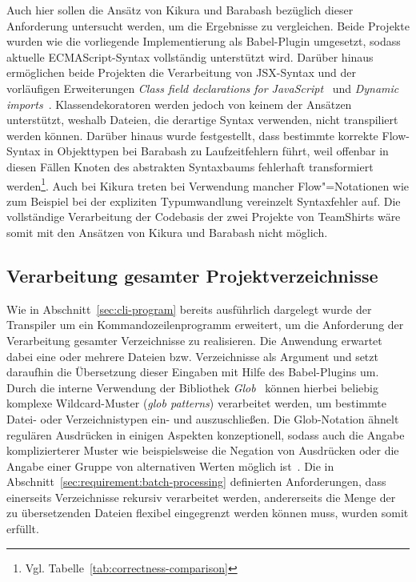 Auch hier sollen die Ansätz von Kikura und Barabash bezüglich dieser Anforderung untersucht werden, um die Ergebnisse zu vergleichen. Beide Projekte wurden wie die vorliegende Implementierung als Babel-Plugin umgesetzt, sodass aktuelle ECMAScript-Syntax vollständig unterstützt wird. Darüber hinaus ermöglichen beide Projekten die Verarbeitung von JSX-Syntax und der vorläufigen Erweiterungen \textit{Class field declarations for JavaScript}~\autocite{ES_PROPOSAL:CLASS_FIELDS} und \textit{Dynamic imports}~\autocite{ES_PROPOSAL:DYNAMIC_IMPORTS}. Klassendekoratoren werden jedoch von keinem der Ansätzen unterstützt, weshalb Dateien, die derartige Syntax verwenden, nicht transpiliert werden können. Darüber hinaus wurde festgestellt, dass bestimmte korrekte Flow-Syntax in Objekttypen bei Barabash zu Laufzeitfehlern führt, weil offenbar in diesen Fällen Knoten des abstrakten Syntaxbaums fehlerhaft transformiert werden\footnote{Vgl. Tabelle~\ref{tab:correctness-comparison}}. Auch bei Kikura treten bei Verwendung mancher Flow"=Notationen wie zum Beispiel bei der expliziten Typumwandlung vereinzelt Syntaxfehler auf. Die vollständige Verarbeitung der Codebasis der zwei Projekte von TeamShirts wäre somit mit den Ansätzen von Kikura und Barabash nicht möglich.

\subsection{Verarbeitung gesamter Projektverzeichnisse}

Wie in Abschnitt~\ref{sec:cli-program} bereits ausführlich dargelegt wurde der Transpiler um ein Kommandozeilenprogramm erweitert, um die Anforderung der Verarbeitung gesamter Verzeichnisse zu realisieren. Die Anwendung erwartet dabei eine oder mehrere Dateien bzw. Verzeichnisse als Argument und setzt daraufhin die Übersetzung dieser Eingaben mit Hilfe des Babel-Plugins um.
Durch die interne Verwendung der Bibliothek \textit{Glob}~\autocite{NPM:GLOB} können hierbei beliebig komplexe Wildcard-Muster (\textit{glob patterns}) verarbeitet werden, um bestimmte Datei- oder Verzeichnistypen ein- und auszuschließen. Die Glob-Notation ähnelt regulären Ausdrücken in einigen Aspekten konzeptionell, sodass auch die Angabe komplizierterer Muster wie beispielsweise die Negation von Ausdrücken oder die Angabe einer Gruppe von alternativen Werten möglich ist~\autocite{MAN:GLOB}.
Die in Abschnitt~\ref{sec:requirement:batch-processing} definierten Anforderungen, dass einerseits Verzeichnisse rekursiv verarbeitet werden, andererseits die Menge der zu übersetzenden Dateien flexibel eingegrenzt werden können muss, wurden somit erfüllt.

